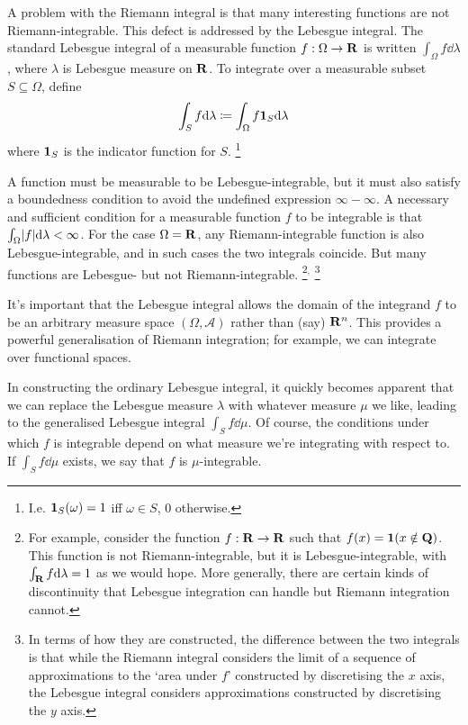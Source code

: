 \documentclass[11pt,letterpaper,reqno,oneside]{article}
\begin{document}
A problem with the Riemann integral is that many interesting functions are not Riemann-integrable. This defect is addressed by the Lebesgue integral. The standard Lebesgue integral of a measurable function $f : \Omega \to \mathbf{R}$ is written $\int_\Omega f \dd \lambda$, where $\lambda$ is Lebesgue measure on $\mathbf{R}$. To integrate over a measurable subset $S \subseteq \Omega$, define
%
\begin{equation*}
	\int_S f \mathrm{d} \lambda \coloneqq \int_\Omega f \boldsymbol{1}_S \mathrm{d} \lambda
\end{equation*}
%
where $\boldsymbol{1}_S$ is the indicator function for $S$.%
	\footnote{I.e. $\boldsymbol{1}_S(\omega)=1$ iff $\omega \in S$, $0$ otherwise.}

A function must be measurable to be Lebesgue-integrable, but it must also satisfy a boundedness condition to avoid the undefined expression $\infty-\infty$. A necessary and sufficient condition for a measurable function $f$ to be integrable is that $\int_\Omega \lvert f\rvert \mathrm{d} \lambda < \infty$. For the case $\Omega=\mathbf{R}$, any Riemann-integrable function is also Lebesgue-integrable, and in such cases the two integrals coincide. But many functions are Lebesgue- but not Riemann-integrable.%
	\footnote{For example, consider the function $f : \mathbf{R} \to \mathbf{R}$ such that $f(x) = \boldsymbol{1}( x \notin \mathbf{Q} )$. This function is not Riemann-integrable, but it is Lebesgue-integrable, with $\int_{\mathbf{R}} f \mathrm{d} \lambda = 1$ as we would hope. More generally, there are certain kinds of discontinuity that Lebesgue integration can handle but Riemann integration cannot.}$^,$%
	\footnote{In terms of how they are constructed, the difference between the two integrals is that while the Riemann integral considers the limit of a sequence of approximations to the `area under $f$' constructed by discretising the $x$ axis, the Lebesgue integral considers approximations constructed by discretising the $y$ axis.}

It's important that the Lebesgue integral allows the domain of the integrand $f$ to be an arbitrary measure space $(\Omega,\mathcal{A})$ rather than (say) $\mathbf{R}^n$. This provides a powerful generalisation of Riemann integration; for example, we can integrate over functional spaces.

In constructing the ordinary Lebesgue integral, it quickly becomes apparent that we can replace the Lebesgue measure $\lambda$ with whatever measure $\mu$ we like, leading to the generalised Lebesgue integral $\int_S f \dd \mu$. Of course, the conditions under which $f$ is integrable depend on what measure we're integrating with respect to. If $\int_S f \dd \mu$ exists, we say that $f$ is $\mu$-integrable.
\end{document}
